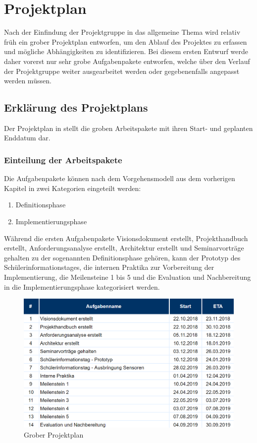 \chapter{Projektplan}
Nach der Einfindung der Projektgruppe in das allgemeine Thema wird relativ früh ein grober Projektplan entworfen, um den Ablauf des Projektes zu erfassen und mögliche Abhängigkeiten zu identifizieren. Bei diesem ersten Entwurf werde daher vorerst nur sehr grobe Aufgabenpakete entworfen, welche über den Verlauf der Projektgruppe weiter ausgearbeitet werden oder gegebenenfalls angepasst werden müssen.

\section{Erklärung des Projektplans}
Der Projektplan in  stellt die groben Arbeitspakete mit ihren Start- und geplanten Enddatum dar. 

\subsection{Einteilung der Arbeitspakete}
Die Aufgabenpakete können nach dem Vorgehensmodell aus dem vorherigen Kapitel in zwei Kategorien eingeteilt werden:
\begin{enumerate}
	\item Definitionsphase 
	\item Implementierungsphase
\end{enumerate}
Während die ersten Aufgabenpakete Visionsdokument erstellt, Projekthandbuch erstellt, Anforderungsanalyse erstellt, Architektur erstellt und Seminarvorträge gehalten zu der sogenannten Definitionsphase gehören, kann der Prototyp des Schülerinformationstages, die internen Praktika zur Vorbereitung der Implementierung, die Meilensteine 1 bis 5 und die Evaluation und Nachbereitung in die Implementierungsphase kategorisiert werden.

\begin{figure}[!ht]
	\centering
	\includegraphics[width=\textwidth]{./ressourcen/projektplan.png}
	\caption{Grober Projektplan}
	\label{fig:Projektplan}
\end{figure}

